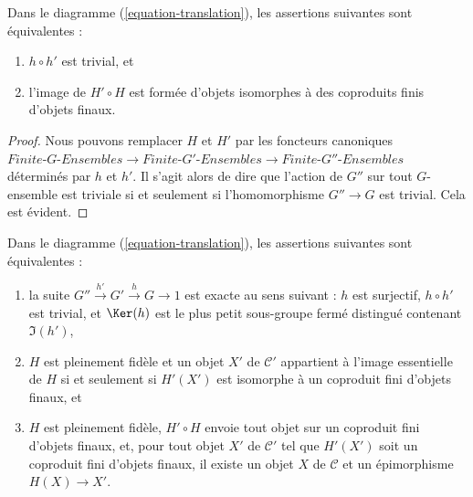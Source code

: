 \begin{lemma}
\label{lemma-composition-trivial}
Dans le diagramme (\ref{equation-translation}), les assertions suivantes sont équivalentes :
\begin{enumerate}
\item $h \circ h'$ est trivial, et
\item l'image de $H' \circ H$ est formée d'objets isomorphes à des coproduits
finis d'objets finaux.
\end{enumerate}
\end{lemma}

\begin{proof}
Nous pouvons remplacer $H$ et $H'$ par les foncteurs canoniques
$\textit{Finite-}G\textit{-Ensembles} \to \textit{Finite-}G'\textit{-Ensembles}
\to \textit{Finite-}G''\textit{-Ensembles}$ déterminés par $h$ et $h'$.
Il s'agit alors de dire que l'action de $G''$ sur tout $G$-ensemble est triviale
si et seulement si l'homomorphisme $G'' \to G$ est trivial. Cela est évident.
\end{proof}

\begin{lemma}
\label{lemma-functoriality-galois-ses}
Dans le diagramme (\ref{equation-translation}), les assertions suivantes sont équivalentes :
\begin{enumerate}
\item la suite $G'' \xrightarrow{h'} G' \xrightarrow{h} G \to 1$
est exacte au sens suivant : $h$ est surjectif, $h \circ h'$ est trivial,
et $\Ker(h)$ est le plus petit sous-groupe fermé distingué contenant $\Im(h')$,
\item $H$ est pleinement fidèle et un objet $X'$ de $\mathcal{C}'$ appartient à
l'image essentielle de $H$ si et seulement si $H'(X')$ est isomorphe à un
coproduit fini d'objets finaux, et
\item $H$ est pleinement fidèle, $H' \circ H$ envoie tout objet sur un coproduit
fini d'objets finaux, et, pour tout objet $X'$ de $\mathcal{C}'$
tel que $H'(X')$ soit un coproduit fini d'objets finaux, il existe
un objet $X$ de $\mathcal{C}$ et un épimorphisme $H(X) \to X'$.
\end{enumerate}
\end{lemma}

